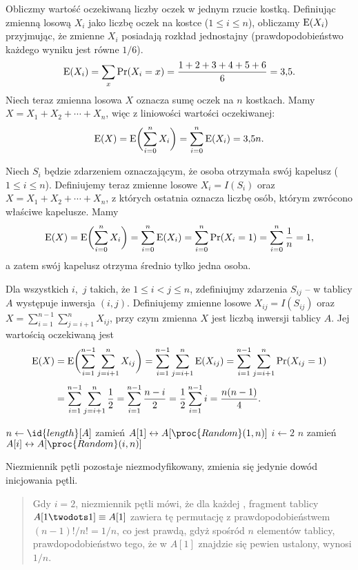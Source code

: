 \exercise %
Obliczmy wartość oczekiwaną liczby oczek w jednym rzucie kostką. Definiując zmienną losową $X_i$ jako liczbę oczek na  kostce ($1\le i\le n$), obliczamy $\operatorname{E}(X_i)$ przyjmując, że zmienne $X_i$ posiadają rozkład jednostajny (prawdopodobieństwo każdego wyniku jest równe $1/6$).
\[
	\operatorname{E}(X_i) = \sum_x\Pr(X_i=x) = \frac{1+2+3+4+5+6}{6} = 3{,}5.
\]
Niech teraz zmienna losowa $X$ oznacza sumę oczek na $n$ kostkach. Mamy $X=X_1+X_2+\cdots+X_n$, więc z liniowości wartości oczekiwanej:
\[
	\operatorname{E}(X) = \operatorname{E}\biggl(\sum_{i=0}^nX_i\biggr) = \sum_{i=0}^n\operatorname{E}(X_i) = 3{,}5n.
\]

\exercise %
Niech $S_i$ będzie zdarzeniem oznaczającym, że  osoba otrzymała swój kapelusz ($1\le i\le n$). Definiujemy teraz zmienne losowe $X_i=I(S_i)$ oraz $X=X_1+X_2+\cdots+X_n$, z których ostatnia oznacza liczbę osób, którym zwrócono właściwe kapelusze. Mamy
\[
	\operatorname{E}(X) = \operatorname{E}\biggl(\sum_{i=0}^nX_i\biggr) = \sum_{i=0}^n\operatorname{E}(X_i) = \sum_{i=0}^n\Pr(X_i=1) = \sum_{i=0}^n\frac{1}{n} = 1,
\]
a zatem swój kapelusz otrzyma średnio tylko jedna osoba.

\exercise %
Dla wszystkich $i$,~$j$ takich, że $1\le i<j\le n$, zdefiniujmy zdarzenia $S_{ij}$ -- w tablicy $A$ występuje inwersja $(i,j)$. Definiujemy zmienne losowe $X_{ij}=I(S_{ij})$ oraz $X=\sum_{i=1}^{n-1}\sum_{j=i+1}^nX_{ij}$, przy czym zmienna $X$ jest liczbą inwersji tablicy $A$. Jej wartością oczekiwaną jest
\begin{align*}
	\operatorname{E}(X) &= \operatorname{E}\biggl(\sum_{i=1}^{n-1}\sum_{j=i+1}^nX_{ij}\biggr) = \sum_{i=1}^{n-1}\sum_{j=i+1}^n\operatorname{E}(X_{ij}) = \sum_{i=1}^{n-1}\sum_{j=i+1}^n\Pr(X_{ij}=1) \\[1mm]
	&= \sum_{i=1}^{n-1}\sum_{j=i+1}^n\frac{1}{2} = \sum_{i=1}^{n-1}\frac{n-i}{2} = \frac{1}{2}\sum_{i=1}^{n-1}i = \frac{n(n-1)}{4}.
\end{align*}


\exercise %
\begin{codebox}
\li	$n\gets\id{length}[A]$
\li	zamień $A[1]\leftrightarrow A[\proc{Random}(1,n)]$
\li	\For $i\gets2$ \To $n$
\li		\Do
			zamień $A[i]\leftrightarrow A[\proc{Random}(i,n)]$
		\End
\end{codebox}
Niezmiennik pętli pozostaje niezmodyfikowany, zmienia się jedynie dowód inicjowania pętli.
\begin{quote}
	Gdy $i=2$, niezmiennik pętli mówi, że dla każdej , fragment tablicy $A[1\twodots1]\equiv A[1]$ zawiera tę permutację z prawdopodobieństwem $(n-1)!/n!=1/n$, co jest prawdą, gdyż spośród $n$ elementów tablicy, prawdopodobieństwo tego, że w $A[1]$ znajdzie się pewien ustalony, wynosi $1/n$.
\end{quote}

